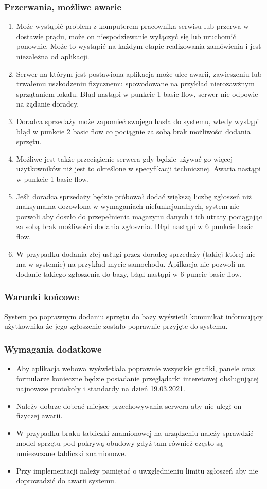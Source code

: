 \documentclass{article}
\begin{document}
\subsubsection{Przerwania, możliwe awarie}
\begin{enumerate}
    \item Może wystąpić problem z komputerem pracownika serwisu lub przerwa w dostawie prądu, może on niespodziewanie wyłączyć się lub uruchomić ponownie. Może to wystąpić na każdym etapie realizowania zamówienia i jest niezależna od aplikacji.
    \item Serwer na którym jest postawiona aplikacja może ulec awarii, zawieszeniu lub trwałemu uszkodzeniu fizycznemu spowodowane na przykład nierozawżnym sprzątaniem lokalu. Błąd nastąpi w punkcie 1 basic flow, serwer nie odpowie na żądanie doradcy.
    \item Doradca sprzedaży może zapomieć swojego hasła do systemu, wtedy wystąpi błąd w punkcie 2 basic flow co pociągnie za sobą brak możliwości dodania sprzętu.
    \item Możliwe jest także przeciążenie serwera gdy będzie używać go więcej użytkowników niż jest to określone w specyfikacji technicznej. Awaria nastąpi w punkcie 1 basic flow.
    \item Jeśli doradca sprzedaży będzie próbował dodać większą liczbę zgłoszeń niż maksymalna dozowlona w wymaganiach niefunkcjonalnych, system nie pozwoli aby doszło do przepełnienia magazynu danych i ich utraty pociągając za sobą brak możliwości dodania zgłosznia. Błąd nastąpi w 6 punkcie basic flow.
    \item W przypadku dodania złej usługi przez doradcę sprzedaży (takiej której nie ma w systemie) na przykład mycie samochodu. Apilkacja nie pozwoli na dodanie takiego zgłoszenia do bazy, błąd nastąpi w 6 puncie basic flow.
\end{enumerate}
\subsubsection{Warunki końcowe}
System po poprawnym dodaniu sprzętu do bazy wyświetli komunikat informujący użytkownika że jego zgłoszenie zostało poprawnie przyjęte do systemu.
\subsubsection{Wymagania dodatkowe}
\begin{itemize}
    \item Aby aplikacja webowa wyświetlała poprawnie wszystkie grafiki, panele oraz formularze konieczne będzie posiadanie przeglądarki interetowej obsługującej najnowsze protokoły i standardy na dzień 19.03.2021.
    \item Należy dobrze dobrać miejsce przechowywania serwera aby nie uległ on fizyczej awarii.
    \item W przypadku braku tabliczki znamionowej na urządzeniu należy sprawdzić model sprzętu pod pokrywą obudowy gdyż tam również często są umieszczane tabliczki znamionowe.
    \item Przy implementacji należy pamiętać o uwzględnieniu limitu zgłoszeń aby nie doprowadzić do awarii systemu.
\end{itemize}
\end{document}
